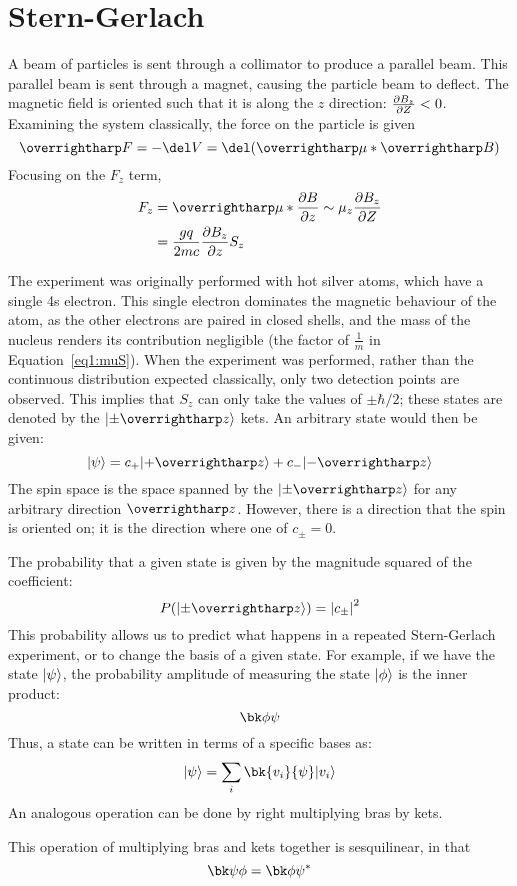 \section{Stern-Gerlach}
A beam of particles is sent through a collimator to produce a parallel beam. This parallel beam is sent through a magnet, causing the particle beam to deflect. 
The magnetic field is oriented such that it is along the \(z\) direction: \(\frac{\partial B_z}{\partial Z}<0\).
Examining the system classically, the force on the particle is given
\[\vv{F}=-\del V=\del(\vv{\mu}*\vv{B})\]
Focusing on the \(F_z\) term,
\begin{align*}
	F_z&=\vv{\mu}*\pder{B}{z}\sim \mu_z\pder{B_z}{Z}\\
	   &=\frac{gq}{2mc}\pder{B_z}{z}S_z
\end{align*}

The experiment was originally performed with hot silver atoms, which have a single 4s electron.
This single electron dominates the magnetic behaviour of the atom, as the other electrons are paired in closed shells, and the mass of the nucleus renders its contribution negligible (the factor of \(\frac{1}{m}\) in Equation~\ref{eq1:muS}).
When the experiment was performed, rather than the continuous distribution expected classically, only two detection points are observed.
This implies that \(S_z\) can only take the values of \(\pm \hbar/2\); these states are denoted by the \(\k{\pm\vv{z}}\) kets. An arbitrary state would then be given:
\[\k\p = c_+\k{+\vv{z}}+c_-\k{-\vv{z}}\]
The spin space is the space spanned by the \(\k{\pm\vv{z}}\) for any arbitrary direction \(\vv{z}\). However, there is a direction that the spin is oriented on; it is the direction where one of \(c_\pm=0\).

The probability that a given state is given by the magnitude squared of the coefficient:
\[P(\k{\pm\vv{z}})= \abs{c_\pm}^2\]
This probability allows us to predict what happens in a repeated Stern-Gerlach experiment, or to change the basis of a given state. For example, if we have the state \(\lvert\psi\rangle\), the probability amplitude of measuring the state \(\lvert\phi\rangle\) is the inner product:
\[\bk\f\p\]
Thus, a state can be written in terms of a specific bases as:
\begin{equation}
	\k\p=\sum_i\bk{v_i}{\p}\k{v_i}\label{eq1:CoB}
\end{equation}
An analogous operation can be done by right multiplying bras by kets.

This operation of multiplying bras and kets together is sesquilinear, in that
\[\bk\p\f=\bk\f\p\ast\]


